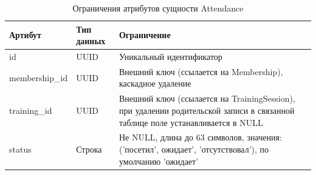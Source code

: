 \begin{table}[H]
	\centering
	\begin{tabular}{|p{3.5cm}|p{3.5cm}|p{8.5cm}|}
		\hline
		\textbf{Артибут}             & \textbf{Тип данных}   & \textbf{Ограничение}             \\ \hline
		id                            & UUID                 & Уникальный идентификатор         \\ \hline
		membership\_id                & UUID                  & Внешний ключ (ссылается на Membership), каскадное удаление \\ \hline
		training\_id         & UUID                  & Внешний ключ (ссылается на TrainingSession), при удалении родительской записи в связанной таблице поле устанавливается в NULL \\ \hline
		status         & Строка                 & Не NULL, длина до 63 символов, значения: ('посетил', ожидает', 'отсутствовал'), по умолчанию 'ожидает'\\ \hline
	\end{tabular}
	\caption{Ограничения атрибутов сущности Attendance}
\end{table}

